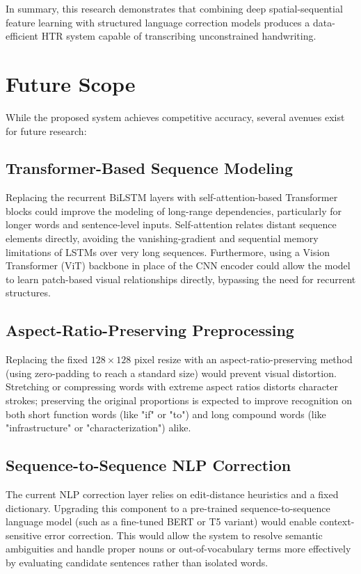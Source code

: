 In summary, this research demonstrates that combining deep spatial-sequential feature learning with structured language correction models produces a data-efficient HTR system capable of transcribing unconstrained handwriting.

\section{Future Scope}
While the proposed system achieves competitive accuracy, several avenues exist for future research:

\subsection{Transformer-Based Sequence Modeling}
Replacing the recurrent BiLSTM layers with self-attention-based Transformer blocks could improve the modeling of long-range dependencies, particularly for longer words and sentence-level inputs. Self-attention relates distant sequence elements directly, avoiding the vanishing-gradient and sequential memory limitations of LSTMs over very long sequences. Furthermore, using a Vision Transformer (ViT) backbone in place of the CNN encoder could allow the model to learn patch-based visual relationships directly, bypassing the need for recurrent structures.

\subsection{Aspect-Ratio-Preserving Preprocessing}
Replacing the fixed $128 \times 128$ pixel resize with an aspect-ratio-preserving method (using zero-padding to reach a standard size) would prevent visual distortion. Stretching or compressing words with extreme aspect ratios distorts character strokes; preserving the original proportions is expected to improve recognition on both short function words (like "if" or "to") and long compound words (like "infrastructure" or "characterization") alike.

\subsection{Sequence-to-Sequence NLP Correction}
The current NLP correction layer relies on edit-distance heuristics and a fixed dictionary. Upgrading this component to a pre-trained sequence-to-sequence language model (such as a fine-tuned BERT or T5 variant) would enable context-sensitive error correction. This would allow the system to resolve semantic ambiguities and handle proper nouns or out-of-vocabulary terms more effectively by evaluating candidate sentences rather than isolated words.

